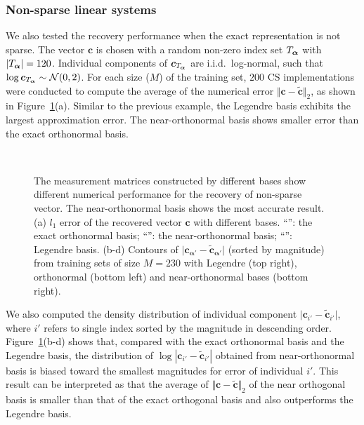 \subsubsection{{Non-sparse} linear systems}
\label{sec:recover_dense}
We also tested the recovery performance when the exact representation is not sparse.
The vector $\bm c$ is chosen with a random non-zero index set $T_{\bm\alpha}$ with $\vert T_{\bm\alpha}\vert = 120$.
Individual components of $\bm c_{T_{\bm\alpha}}$ are i.i.d.\ log-normal, such that $\log \bm c_{T_{\bm\alpha}} \sim \mathcal{N}(0,2)$.
For each size ($M$) of the training set, $200$ CS implementations were conducted to compute the average of the numerical error $\Vert \bm c - \tilde{\bm c}\Vert_2$, as shown in Figure~\ref{fig:err_no_sparse_vector}(a).
Similar to the previous example, the Legendre basis exhibits the largest approximation error.
The near-orthonormal basis shows smaller error than the exact orthonormal basis.

\begin{figure}[tbp]
  \center
  \\
  \caption{The measurement matrices constructed by different bases show 
    different numerical performance for the recovery
   of non-sparse vector. The near-orthonormal basis shows the most accurate result.
  (a) $l_1$ error of the recovered vector $\mathbf{c}$ with different bases. 
    ``\textcolor{red}{\protect\rectanglesolidline}'': the exact orthonormal  basis;  
  ``\textcolor{green}{\protect\triangledashline}'': the near-orthonormal  basis;  
  ``\textcolor{blue}{\protect\diamonddashdotline}'': Legendre basis.
  (b-d) Contours of $\vert \mathbf{c}_{\bm{\alpha}'} -\tilde{\mathbf{c}}_{\bm{\alpha}'}\vert$ (sorted by magnitude) from training
  sets of size $M = 230$ with Legendre (top right), orthonormal (bottom left) and near-orthonormal bases (bottom right).}
\label{fig:err_no_sparse_vector}
\end{figure}


We also computed the density distribution of individual component $\vert \bm c_{i'} - \tilde{\bm c}_{i'}\vert$, where $i'$ 
refers to single index sorted by the magnitude in descending order.
Figure~\ref{fig:err_no_sparse_vector}(b-d) shows that, compared with the exact orthonormal basis and the Legendre basis, the 
distribution of $\log\left \vert \bm c_{i'} - \tilde{\bm c}_{i'}\right\vert$ obtained from near-orthonormal basis is 
biased toward the smallest magnitudes for error of individual $i'$. This result can be interpreted as that the 
average of $\Vert \bm c - \tilde{\bm c}\Vert_2$ of the near orthogonal basis is smaller than that of the exact 
orthogonal basis and also outperforms the Legendre basis. 

